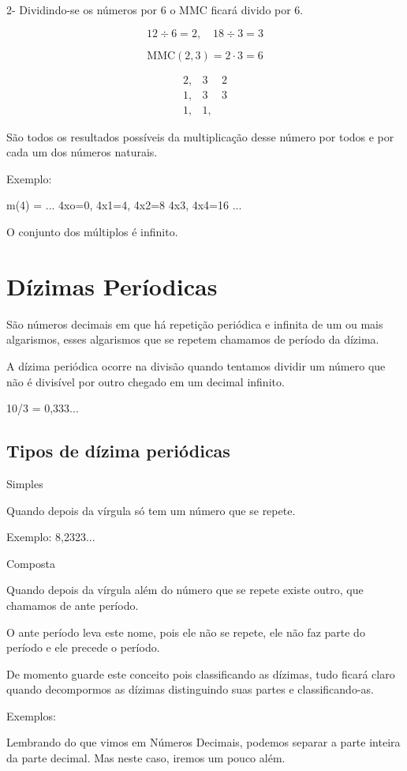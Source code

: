 \documentclass[letterpaper]{book}
\begin{document}
2- Dividindo-se os números por 6 o MMC ficará divido por 6.

\[12 \div 6 = 2, \quad 18 \div 3 = 3\]

\[\text{MMC}(2,3) = 2 \cdot 3 = 6\]

\[
\begin{array}{cc|cc}
2, & 3 & 2 \\
1, & 3 & 3 \\
1, & 1,
\end{array}
\]
   
São todos os resultados possíveis da multiplicação desse número por todos e por cada um dos números naturais.

Exemplo:

m(4) = {... 4xo=0, 4x1=4, 4x2=8 4x3, 4x4=16 ...}

O conjunto dos múltiplos é infinito.


\section{Dízimas Períodicas}

São números decimais em que há repetição periódica e infinita de um ou mais algarismos, esses algarismos que se repetem chamamos de período da dízima.

A dízima periódica ocorre na divisão quando tentamos dividir um número que não é divisível por outro chegado em um decimal infinito.

10/3 = 0,333...

\subsection{Tipos de dízima periódicas}

Simples

Quando depois da vírgula só tem um número que se repete.

Exemplo: 8,2323...

Composta

Quando depois da vírgula além do número que se repete existe outro, que chamamos de ante período.

O ante período leva este nome, pois ele não se repete, ele não faz parte do período e ele precede o período.

De momento guarde este conceito pois classificando as dízimas, tudo ficará claro quando decompormos as dízimas distinguindo suas partes e classificando-as.

Exemplos:

Lembrando do que vimos em Números Decimais, podemos separar a parte inteira da parte decimal. Mas neste caso, iremos um pouco além.
\end{document}
